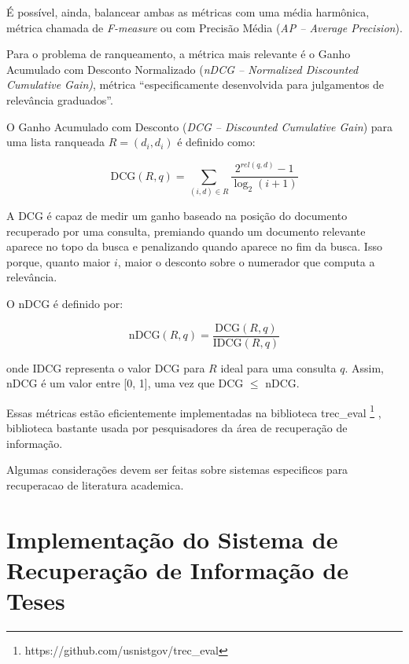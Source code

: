 \documentclass[
	12pt,				%
	openright,			%
	oneside,			%
	a4paper,			%
	english,			%
	french,				%
	spanish,			%
	brazil				%
	]{abntex2}
\begin{document}
É possível, ainda, balancear ambas as métricas com uma média harmônica, métrica chamada de \textit{F-measure} ou com Precisão Média (\textit{AP -- Average Precision}).

Para o problema de ranqueamento, a métrica mais relevante é o Ganho Acumulado com Desconto Normalizado (\textit{nDCG -- Normalized Discounted Cumulative Gain)}, métrica ``especificamente desenvolvida para julgamentos de relevância graduados''.\cite{}

O Ganho Acumulado com Desconto (\textit{DCG -- Discounted Cumulative Gain}) para uma lista ranqueada $R = {(d_i, d_i)}$ é definido como:

\begin{equation}
    \text{DCG}(R,q) = \sum_{(i,d)\in R}\frac{2^{rel(q,d)} - 1}{\log_{2}(i+1)}
\end{equation}

A DCG é capaz de medir um ganho baseado na posição do documento recuperado por uma consulta, premiando quando um documento relevante aparece no topo da busca e penalizando quando aparece no fim da busca.
Isso porque, quanto maior $i$, maior o desconto sobre o numerador que computa a relevância.

O nDCG é definido por:

\begin{equation}
    \text{nDCG}(R,q) = \frac{\text{DCG}(R,q)}{\text{IDCG}(R,q)}
\end{equation}

onde IDCG representa o valor DCG para $R$ ideal para uma consulta $q$.
Assim, nDCG é um valor entre [0, 1], uma vez que DCG $\leq$ nDCG.

Essas métricas estão eficientemente implementadas na biblioteca trec\_eval
\footnote{https://github.com/usnistgov/trec\_eval}
, biblioteca bastante usada por
pesquisadores da área de recuperação de informação.

Algumas considerações devem ser feitas sobre sistemas especificos para recuperacao de literatura academica.




\chapter{Implementação do Sistema de Recuperação de Informação de Teses}
\label{ch:implementacao-do-sistema-de-recuperacao-de-informacao-de-teses}
\end{document}
